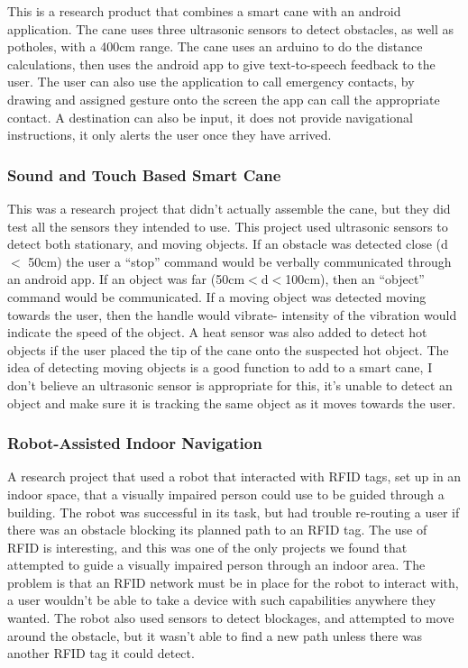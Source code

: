 \documentclass[letterpaper,12pt]{article}
\begin{document}
This is a research product that combines a smart cane with an android application. The cane uses three ultrasonic sensors to detect obstacles, as well as potholes, with a 400cm range. The cane uses an arduino to do the distance calculations, then uses the android app to give text-to-speech feedback to the user. The user can also use the application to call emergency contacts, by drawing and assigned gesture onto the screen the app can call the appropriate contact. A destination can also be input, it does not provide navigational instructions, it only alerts the user once they have arrived. \cite{SmartStick}

\subsubsection{Sound and Touch Based Smart Cane}

This was a research project that didn’t actually assemble the cane, but they did test all the sensors they intended to use. This project used ultrasonic sensors to detect both stationary, and moving objects. If an obstacle was detected close (d $<$ 50cm)  the user a “stop” command would be verbally communicated through an android app. If an object was far (50cm$<$d$<$100cm), then an “object” command would be communicated. If a moving object was detected moving towards the user, then the handle would vibrate- intensity of the vibration would indicate the speed of the object. A heat sensor was also added to detect hot objects if the user placed the tip of the cane onto the suspected hot object. The idea of detecting moving objects is a good function to add to a smart cane, I don’t believe an ultrasonic sensor is appropriate for this, it’s unable to detect an object and make sure it is tracking the same object as it moves towards the user. \cite{Sound}

\subsubsection{Robot-Assisted Indoor Navigation} 

A research project that used a robot that interacted with RFID tags, set up in an indoor space, that a visually impaired person could use to be guided through a building. The robot was successful in its task, but had trouble re-routing a user if there was an obstacle blocking its planned path to an RFID tag. The use of RFID is interesting, and this was one of the only projects we found that attempted to guide a visually impaired person through an indoor area. The problem is that an RFID network must be in place for the robot to interact with, a user wouldn’t be able to take a device with such capabilities anywhere they wanted. The robot also used sensors to detect blockages, and attempted to move around the obstacle, but it wasn’t able to find a new path unless there was another RFID tag it could detect. \cite{Indoor}
\end{document}

